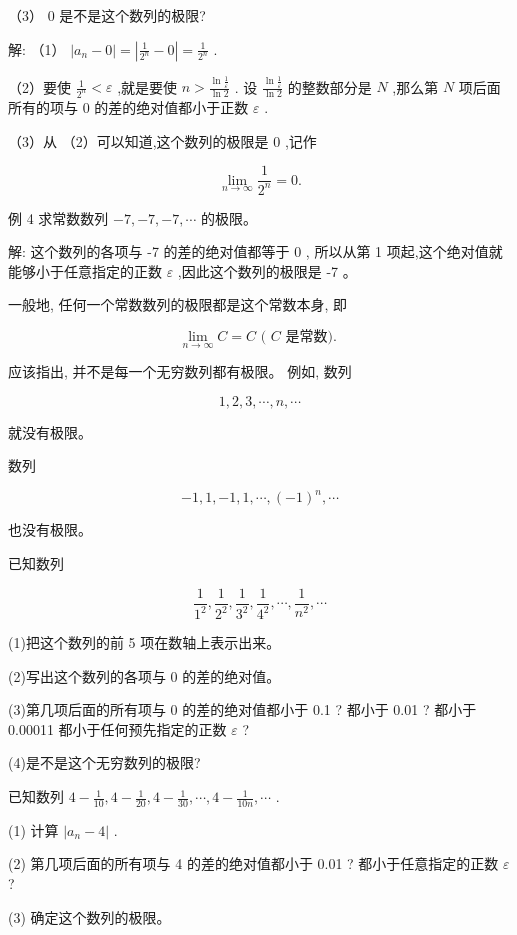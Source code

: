 \documentclass[lang=cn,newtx,12pt,scheme=chinese]{elegantbook}
\begin{document}
（3） 0 是不是这个数列的极限?

解: （1） \(\left| {{a}_{n} - 0}\right| = \left| {\frac{1}{{2}^{n}} - 0}\right| = \frac{1}{{2}^{n}}\) .

（2）要使 \(\frac{1}{{2}^{n}} < \varepsilon\) ,就是要使 \(n > \frac{\ln \frac{1}{\varepsilon }}{\ln 2}\) . 设 \(\frac{\ln \frac{1}{\varepsilon }}{\ln 2}\) 的整数部分是 \(N\) ,那么第 \(N\) 项后面所有的项与 0 的差的绝对值都小于正数 \(\varepsilon\) .

（3）从 （2）可以知道,这个数列的极限是 0 ,记作

\[
\mathop{\lim }\limits_{{n \rightarrow \infty }}\frac{1}{{2}^{n}} = 0 \text{.}
\]

例 4 求常数数列 \(- 7, - 7, - 7,\cdots\) 的极限。

解: 这个数列的各项与 -7 的差的绝对值都等于 0 , 所以从第 1 项起,这个绝对值就能够小于任意指定的正数 \(\varepsilon\) ,因此这个数列的极限是 -7 。

一般地, 任何一个常数数列的极限都是这个常数本身, 即

\[
\mathop{\lim }\limits_{{n \rightarrow \infty }}C = C\text{ ( }C\text{ 是常数). }
\]

应该指出, 并不是每一个无穷数列都有极限。 例如, 数列

\[
1,2,3,\cdots ,n,\cdots
\]

就没有极限。

数列

\[
- 1,1, - 1,1,\cdots ,{\left( -1\right) }^{n},\cdots
\]

也没有极限。

\begin{problemset}[练习]
	\item 已知数列
	
	\[
	\frac{1}{{1}^{2}},\frac{1}{{2}^{2}},\frac{1}{{3}^{2}},\frac{1}{{4}^{2}},\cdots ,\frac{1}{{n}^{2}},\cdots
	\]
	
	(1)把这个数列的前 5 项在数轴上表示出来。
	
	(2)写出这个数列的各项与 0 的差的绝对值。
	
	(3)第几项后面的所有项与 0 的差的绝对值都小于 0.1 ? 都小于 0.01 ? 都小于 0.00011 都小于任何预先指定的正数 \(\varepsilon\) ?
	
	(4)是不是这个无穷数列的极限?
	
	\item 已知数列 \(4 - \frac{1}{10},4 - \frac{1}{20},4 - \frac{1}{30},\cdots ,4 - \frac{1}{10n},\cdots\) .
	
	(1) 计算 \(\left| {{a}_{n} - 4}\right|\) .
	
	(2) 第几项后面的所有项与 4 的差的绝对值都小于 0.01 ? 都小于任意指定的正数 \(\varepsilon\) ?
	
	(3) 确定这个数列的极限。
\end{problemset}
\end{document}
